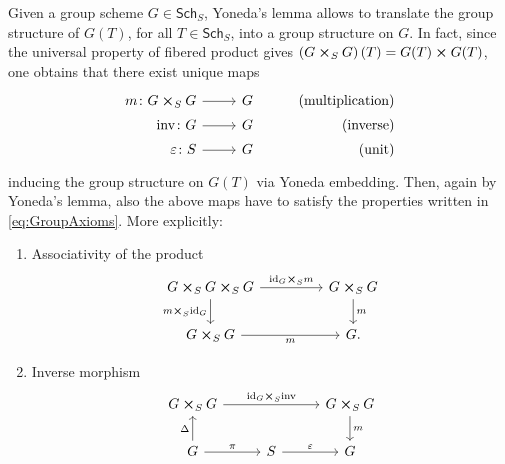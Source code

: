 \documentclass[../Main]{subfiles}
\begin{document}
\begin{rem}[]\label{rem:StructuralMorphisms}
	Given a group scheme $G \in \mathsf{Sch}_{ S }$, Yoneda's lemma allows to translate
	the group structure of $G(T)$, for all $T \in \mathsf{Sch}_{ S }$, into a group structure on $G$.
	In fact, since the universal property of
	fibered product gives $\left( G \cross_{ S } G \right)(T) = G(T) \cross G(T)$,
	one obtains that there exist unique maps
	\begin{equation*}
			\begin{tikzcd}[row sep = 0ex
         ,/tikz/column 1/.append style={anchor=base east}
         ,/tikz/column 2/.append style={anchor=base west}
         ,/tikz/column 3/.append style={anchor=base east}]
			m\colon G \cross_{ S } G \arrow[r, "", rightarrow] &
			G & \text{(multiplication)} \\
			\mathrm{inv}\colon G \arrow[r, "", rightarrow] &
			G & \text{(inverse)} \\
			\varepsilon \colon S \arrow[r, "", rightarrow] &
			G & \text{(unit)} 
		\end{tikzcd}
	\end{equation*} 
	inducing the group structure on $G(T)$ via Yoneda embedding.
	Then, again by Yoneda's lemma, also the above maps have to
	satisfy the properties written in 
	\cref{eq:GroupAxioms}.
	More explicitly:
	\begin{enumerate}
		\item Associativity of the product
			\begin{equation*}
			\begin{tikzcd}[column sep=4.5em]
				G \cross_{ S } G \cross_{ S } G 
				\arrow[r, "\mathrm{id}_{ G } \cross_S m", rightarrow] 
				\arrow[d, "m \cross_S \mathrm{id}_{ G }"', rightarrow] &
				G \cross_{ S } G \arrow[d, "m", rightarrow] \\
				G \cross_{ S } G \arrow[r, "m"', rightarrow] &
				G.
			\end{tikzcd}
			\end{equation*} 
		\item Inverse morphism 
			\begin{equation*}
			\begin{tikzcd}[column sep=2.7em]
				G \cross_{ S } G
				\arrow[rr, "\mathrm{id}_{ G } \cross_S \mathrm{inv}", rightarrow] & &
				G \cross_{ S } G \arrow[d, "m", rightarrow] \\
				G \arrow[u, "\Delta", rightarrow] 
				\arrow[r, "\pi", rightarrow] &
				S \arrow[r, "\varepsilon", rightarrow] & 
				G
			\end{tikzcd}

\end{equation*}
\end{enumerate}
\end{rem}
\end{document}
